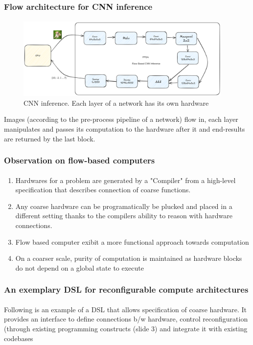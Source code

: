 \documentclass{beamer}
\begin{document}
\begin{frame}[fragile]
  \frametitle{Flow architecture for CNN inference}
  \framesubtitle{}
  \begin{figure}
    \centering
    \includegraphics[width=0.95\textwidth]{flowcnn.png}
    \caption{CNN inference. Each layer of a network has its own hardware}
    \label{}
  \end{figure}

  Images (according to the pre-process pipeline of a network) flow
  in, each layer manipulates and passes its computation to the
  hardware after it and end-results are returned by the last
  block.
\end{frame}

\begin{frame}[fragile]
  \frametitle{Observation on flow-based computers}
  \framesubtitle{}
  \begin{enumerate}
      
    \item Hardwares for a problem are generated by a "Compiler" from a high-level
      specification that describes connection of coarse functions.
    \item Any coarse hardware can be programatically be plucked and placed in a
      different setting thanks to the compilers ability to reason with hardware
      connections.
    \item Flow based computer exibit a more functional approach towards
      computation
    \item On a coarser scale, purity of computation is maintained as hardware
      blocks do not depend on a global state to execute
  \end{enumerate}
\end{frame}

\begin{frame}[fragile]
  \frametitle{An exemplary DSL for reconfigurable compute architectures}
\framesubtitle{}
  Following is an example of a DSL that allows specification of coarse hardware.
  It provides an interface to define connections b/w hardware, control
  reconfiguration (through existing programming constructs (slide 3) and
  integrate it with existing codebases

\end{frame}
\end{document}

